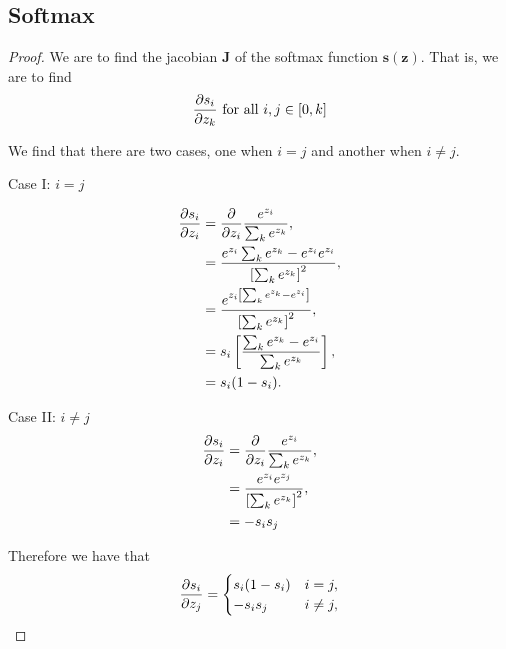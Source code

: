 \documentclass{article}
\begin{document}
\subsection{Softmax}
\begin{proof}
    We are to find the jacobian $\mathbf{J}$ of the softmax function $\mathbf{s}(\mathbf{z})$. That is, we are to find
    \begin{equation*}
        \pdv{s_{i}}{z_{k}} \text{ for all } i, j \in [0, k]
    \end{equation*}

    We find that there are two cases, one when $i = j$ and another when $i \neq j$.

    Case I: $i = j$

    \begin{align*}
        \pdv{s_{i}}{z_{i}} &= \pdv{}{z_{i}} \frac{e^{z_{i}}}{\sum_{k}e^{z_{k}}},\\
                           &= \frac{e^{z_{i}}\sum_{k}e^{z_{k}} - e^{z_{i}}e^{z_{i}}}{\left[\sum_{k}e^{z_{k}}\right]^{2}},\\
                           &= \frac{e^{z_{i}\left[\sum_{k}e^{z_{k}} - e^{z_{i}}\right]}}{\left[\sum_{k}e^{z_{k}}\right]^{2}},\\
                           &= s_{i}\left[\frac{\sum_{k}e^{z_{k}} - e^{z_{i}}}{\sum_{k}e^{z_{k}}}\right],\\
                           &= s_{i}(1 - s_{i}).
    \end{align*}

    Case II: $i \neq j$
    \begin{align*}
        \pdv{s_{i}}{z_{i}} &= \pdv{}{z_{i}} \frac{e^{z_{i}}}{\sum_{k}e^{z_{k}}},\\
                           &= \frac{e^{z_{i}}e^{z_{j}}}{\left[\sum_{k}e^{z_{k}}\right]^{2}},\\
                           &= -s_{i}s_{j}
    \end{align*}

    Therefore we have that
    \begin{equation*}
        \pdv{s_{i}}{z_{j}} = \begin{cases}
            s_{i}(1 - s_{i}) & i = j,\\
            -s_{i}s_{j} & i \neq j,\\
            \end{cases}
    \end{equation*}
\end{proof}

\newpage
\end{document}
